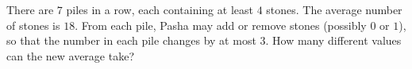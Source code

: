 There are $7$ piles in a row, each containing at least $4$ stones. The average number of stones is $18$. From each pile, Pasha may add or remove stones (possibly $0$ or $1$), so that the number in each pile changes by at most $3$. How many different values can the new average take?
